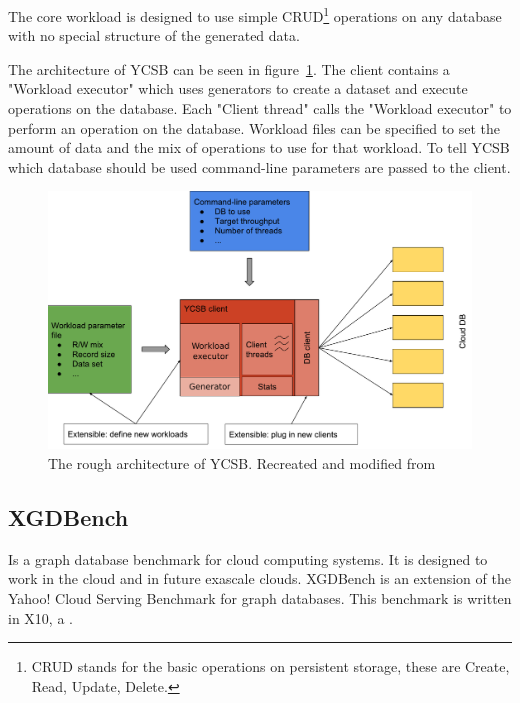 The core workload is designed to use simple CRUD\footnote{CRUD stands for the basic operations on persistent storage, these are Create, Read, Update, Delete.} operations on any database with no special structure of the generated data.

The architecture of YCSB can be seen in figure~\ref{fig:ycsbArchitecture}.
The client contains a "Workload executor" which uses generators to create a dataset and execute operations on the database.
Each "Client thread" calls the "Workload executor" to perform an operation on the database.
Workload files can be specified to set the amount of data and the mix of operations to use for that workload.
To tell YCSB which database should be used command-line parameters are passed to the client.

\begin{figure}[h!]
  \centering
  \includegraphics[width=\textwidth]{images/benchmarks/ycsbArchitecture}
  \caption{The rough architecture of YCSB. Recreated and modified from~\cite[25]{Abubakar2014}}
  \label{fig:ycsbArchitecture}
\end{figure}

\subsection{XGDBench}
Is a graph database benchmark for cloud computing systems.
It is designed to work in the cloud and in future exascale clouds.
XGDBench is an extension of the Yahoo! Cloud Serving Benchmark for graph databases.
This benchmark is written in X10,
a .

